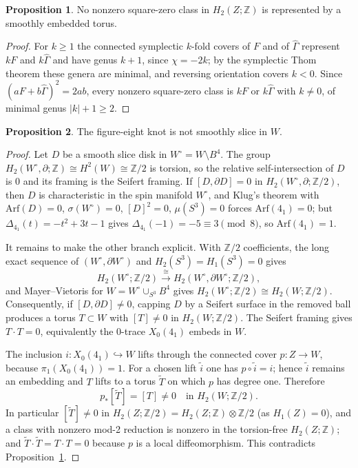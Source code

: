 \documentclass[11pt]{article}
\newcommand{\Z}{\mathbb{Z}}
\newcommand{\pione}{\pi_1}
\newcommand{\Ghat}{\widehat{\Gamma}}
\theoremstyle{definition}
\newtheorem{proposition}{Proposition}[section]
\begin{document}
\begin{proposition}\label{prop:torus}
No nonzero square-zero class in $H_2(Z;\Z)$ is represented by a smoothly
embedded torus.
\end{proposition}

\begin{proof}
For $k\ge1$ the connected symplectic $k$-fold covers of $F$ and of $\Ghat$
represent $kF$ and $k\Ghat$ and have genus $k+1$, since $\chi=-2k$; by the
symplectic Thom theorem these genera are minimal, and reversing
orientation covers $k<0$. Since $(aF+b\Ghat)^2=2ab$, every nonzero
square-zero class is $kF$ or $k\Ghat$ with $k\ne0$, of minimal genus
$|k|+1\ge2$.
\end{proof}

\begin{proposition}\label{prop:slice}
The figure-eight knot is not smoothly slice in $W$.
\end{proposition}

\begin{proof}
Let $D$ be a smooth slice disk in $W^\circ=W\setminus B^4$. The group
$H_2(W^\circ,\partial;\Z)\cong H^2(W)\cong\Z/2$ is torsion, so the
relative self-intersection of $D$ is $0$ and its framing is the Seifert
framing. If $[D,\partial D]=0$ in $H_2(W^\circ,\partial;\Z/2)$, then $D$
is characteristic in the spin manifold $W^\circ$, and Klug's theorem with
$\mathrm{Arf}(D)=0$, $\sigma(W^\circ)=0$, $[D]^2=0$, $\mu(S^3)=0$ forces
$\mathrm{Arf}(4_1)=0$; but $\Delta_{4_1}(t)=-t^2+3t-1$ gives
$\Delta_{4_1}(-1)=-5\equiv3\pmod 8$, so $\mathrm{Arf}(4_1)=1$.

It remains to make the other branch explicit.  With $\Z/2$ coefficients,
the long exact sequence of $(W^\circ,\partial W^\circ)$ and
$H_2(S^3)=H_1(S^3)=0$ gives
\[
 H_2(W^\circ;\Z/2)\xrightarrow{\cong}
 H_2(W^\circ,\partial W^\circ;\Z/2),
\]
and Mayer--Vietoris for $W=W^\circ\cup_{S^3}B^4$ gives
$H_2(W^\circ;\Z/2)\cong H_2(W;\Z/2)$.  Consequently, if
$[D,\partial D]\ne0$, capping $D$ by a Seifert surface in the removed ball
produces a torus $T\subset W$ with $[T]\ne0$ in $H_2(W;\Z/2)$.  The
Seifert framing gives $T\cdot T=0$, equivalently the 0-trace
$X_0(4_1)$ embeds in $W$.

The inclusion $i:X_0(4_1)\hookrightarrow W$ lifts through the connected
cover $p:Z\to W$, because $\pione(X_0(4_1))=1$.  For a chosen lift
$\widetilde i$ one has $p\circ\widetilde i=i$; hence $\widetilde i$ remains
an embedding and $T$ lifts to a torus $\widetilde T$ on which $p$ has degree
one.  Therefore
\[
 p_*[\widetilde T]=[T]\ne0\quad\text{in }H_2(W;\Z/2).
\]
In particular
$[\widetilde T]\ne0$ in $H_2(Z;\Z/2)=H_2(Z;\Z)\otimes\Z/2$ (as $H_1(Z)=0$),
and a class with nonzero mod-2 reduction is nonzero in the torsion-free
$H_2(Z;\Z)$; and $\widetilde T\cdot\widetilde T=T\cdot T=0$ because $p$
is a local diffeomorphism. This
contradicts Proposition~\ref{prop:torus}.
\end{proof}
\end{document}

